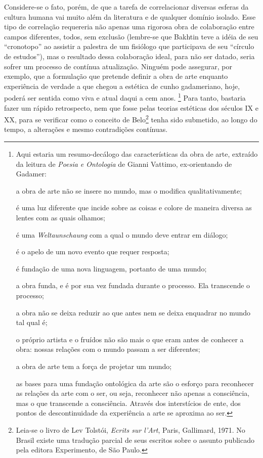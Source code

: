 Considere-se o fato, porém, de que a tarefa de correlacionar diversas
esferas da cultura humana vai muito além da literatura e de qualquer
domínio isolado. Esse tipo de correlação requereria não apenas uma
rigorosa obra de colaboração entre campos diferentes, todos, sem
exclusão (lembre-se que Bakhtin teve a idéia de seu ``cronotopo'' ao
assistir a palestra de um fisiólogo que participava de seu ``círculo de
estudos''), mas o resultado dessa colaboração ideal, para não ser
datado, seria sofrer um processo de contínua atualização. Ninguém pode
assegurar, por exemplo, que a formulação que pretende definir a obra de
arte enquanto experiência de verdade a que chegou a estética de cunho
gadameriano, hoje, poderá ser sentida como viva e atual daqui a cem
anos. \footnote{Aqui estaria um resumo-decálogo das características da
  obra de arte, extraído da leitura de \emph{Poesia e Ontologia} de
  Gianni Vattimo, ex-orientando de Gadamer:

  a obra de arte não se insere no mundo, mas o modifica
  qualitativamente;

  é uma luz diferente que incide sobre as coisas e colore de maneira
  diversa as lentes com as quais olhamos;

  é uma \emph{Weltaunschaung} com a qual o mundo deve entrar em diálogo;

  é o apelo de um novo evento que requer resposta;

  é fundação de uma nova linguagem, portanto de uma mundo;

  a obra funda, e é por sua vez fundada durante o processo. Ela
  transcende o processo;

  a obra não se deixa reduzir ao que antes nem se deixa enquadrar no
  mundo tal qual é;

  o próprio artista e o fruídos não são mais o que eram antes de
  conhecer a obra: nossas relações com o mundo passam a ser diferentes;

  a obra de arte tem a força de projetar um mundo;

  as bases para uma fundação ontológica da arte são o esforço para
  reconhecer as relações da arte com o ser, ou seja, reconhecer não
  apenas a consciência, mas o que transcende a consciência. Através dos
  interstícios de ente, dos pontos de descontinuidade da experiência a
  arte se aproxima ao ser.} Para tanto, bastaria fazer um rápido
retrospecto, nem que fosse pelas teorias estéticas dos séculos IX e XX,
para se verificar como o conceito de Belo\footnote{Leia-se o livro de
  Lev Tolstói, \emph{Ecrits sur l'Art}, Paris, Gallimard, 1971. No
  Brasil existe uma tradução parcial de seus escritos sobre o assunto
  publicado pela editora Experimento, de São Paulo.} tenha sido
submetido, ao longo do tempo, a alterações e mesmo contradições
contínuas.

